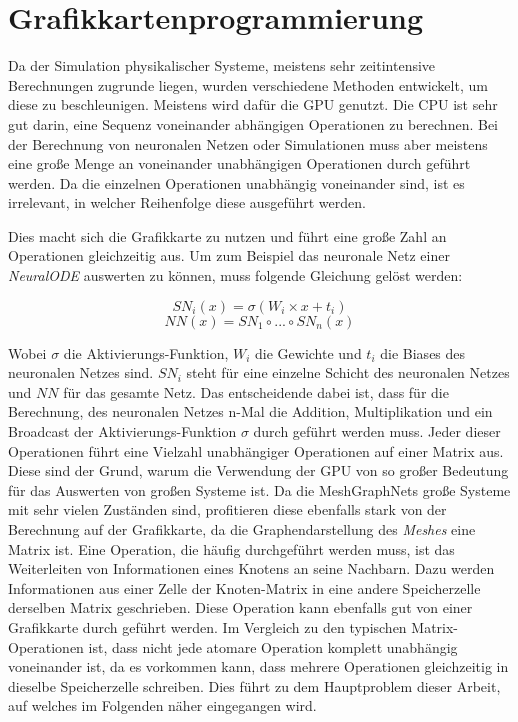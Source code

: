 
\section{Grafikkartenprogrammierung} \label{sec:gpu}

Da der Simulation physikalischer Systeme,
meistens sehr zeitintensive Berechnungen zugrunde liegen, 
wurden verschiedene Methoden entwickelt, 
um diese zu beschleunigen.
Meistens wird dafür die GPU genutzt.
Die CPU ist sehr gut darin, eine Sequenz voneinander abhängigen Operationen zu berechnen.
Bei der Berechnung von neuronalen Netzen oder Simulationen muss aber meistens eine große Menge 
an voneinander unabhängigen Operationen durch geführt werden.
Da die einzelnen Operationen unabhängig voneinander sind, ist es irrelevant, in welcher Reihenfolge diese ausgeführt werden.

Dies macht sich die Grafikkarte zu nutzen und führt eine große Zahl an Operationen gleichzeitig aus.
Um zum Beispiel das neuronale Netz einer \textit{NeuralODE} auswerten zu können, muss folgende Gleichung gelöst werden:

$$
SN_i(x) = \sigma ( W_i \times x + t_i )
$$
$$
NN(x) = SN_1 \circ ... \circ SN_n (x)
$$

Wobei $\sigma$ die Aktivierungs-Funktion, $W_i$ die Gewichte und $t_i$ die Biases des neuronalen Netzes sind.
$SN_i$ steht für eine einzelne Schicht des neuronalen Netzes und $NN$ für das gesamte Netz.
Das entscheidende dabei ist, dass für die Berechnung, des neuronalen Netzes n-Mal die Addition, Multiplikation und ein Broadcast der Aktivierungs-Funktion
$\sigma$ durch geführt werden muss.
Jeder dieser Operationen führt eine Vielzahl unabhängiger Operationen auf einer Matrix aus.
Diese sind der Grund, warum die Verwendung der GPU von so großer Bedeutung für das Auswerten von großen Systeme ist.
Da die MeshGraphNets große Systeme mit sehr vielen Zuständen sind, profitieren diese ebenfalls stark von der Berechnung auf der Grafikkarte,
da die Graphendarstellung des \textit{Meshes} eine Matrix ist.
Eine Operation, die häufig durchgeführt werden muss, ist das Weiterleiten von Informationen eines Knotens an seine Nachbarn.
Dazu werden Informationen aus einer Zelle der Knoten-Matrix in eine andere Speicherzelle derselben Matrix geschrieben.
Diese Operation kann ebenfalls gut von einer Grafikkarte durch geführt werden.
Im Vergleich zu den typischen Matrix-Operationen ist, dass nicht jede atomare Operation komplett unabhängig voneinander ist,
da es vorkommen kann, dass mehrere Operationen gleichzeitig in dieselbe Speicherzelle schreiben.
Dies führt zu dem Hauptproblem dieser Arbeit, auf welches im Folgenden näher eingegangen wird.

% 